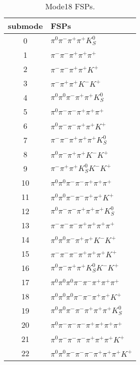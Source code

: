\begin{table}[h!]
\begin{center}
\begin{tabular}{cl}
\hline
submode& FSPs\\
\hline
0 & $\pi^0 \pi^- \pi^+ \pi^+ K_S^0 $ \\
1 & $\pi^- \pi^- \pi^+ \pi^+ \pi^+ $ \\
2 & $\pi^- \pi^- \pi^+ \pi^+ K^+ $ \\
3 & $\pi^- \pi^+ \pi^+ K^- K^+ $ \\
4 & $\pi^0 \pi^0 \pi^- \pi^+ \pi^+ K_S^0 $ \\
5 & $\pi^0 \pi^- \pi^- \pi^+ \pi^+ \pi^+ $ \\
6 & $\pi^0 \pi^- \pi^- \pi^+ \pi^+ K^+ $ \\
7 & $\pi^- \pi^- \pi^+ \pi^+ \pi^+ K_S^0 $ \\
8 & $\pi^0 \pi^- \pi^+ \pi^+ K^- K^+ $ \\
9 & $\pi^- \pi^+ \pi^+ K_S^0 K^- K^+ $ \\
10 & $\pi^0 \pi^0 \pi^- \pi^- \pi^+ \pi^+ \pi^+ $ \\
11 & $\pi^0 \pi^0 \pi^- \pi^- \pi^+ \pi^+ K^+ $ \\
12 & $\pi^0 \pi^- \pi^- \pi^+ \pi^+ \pi^+ K_S^0 $ \\
13 & $\pi^- \pi^- \pi^- \pi^+ \pi^+ \pi^+ \pi^+ $ \\
14 & $\pi^0 \pi^0 \pi^- \pi^+ \pi^+ K^- K^+ $ \\
15 & $\pi^- \pi^- \pi^- \pi^+ \pi^+ \pi^+ K^+ $ \\
16 & $\pi^0 \pi^- \pi^+ \pi^+ K_S^0 K^- K^+ $ \\
17 & $\pi^0 \pi^0 \pi^0 \pi^- \pi^- \pi^+ \pi^+ \pi^+ $ \\
18 & $\pi^0 \pi^0 \pi^0 \pi^- \pi^- \pi^+ \pi^+ K^+ $ \\
19 & $\pi^0 \pi^0 \pi^- \pi^- \pi^+ \pi^+ \pi^+ K_S^0 $ \\
20 & $\pi^0 \pi^- \pi^- \pi^- \pi^+ \pi^+ \pi^+ \pi^+ $ \\
21 & $\pi^0 \pi^- \pi^- \pi^- \pi^+ \pi^+ \pi^+ K^+ $ \\
22 & $\pi^0 \pi^0 \pi^- \pi^- \pi^- \pi^+ \pi^+ \pi^+ K^+ $ \\
\hline
\end{tabular}
\label{tab:Mode18FSPs}
\caption{Mode18 FSPs.}
\end{center}
\end{table}
